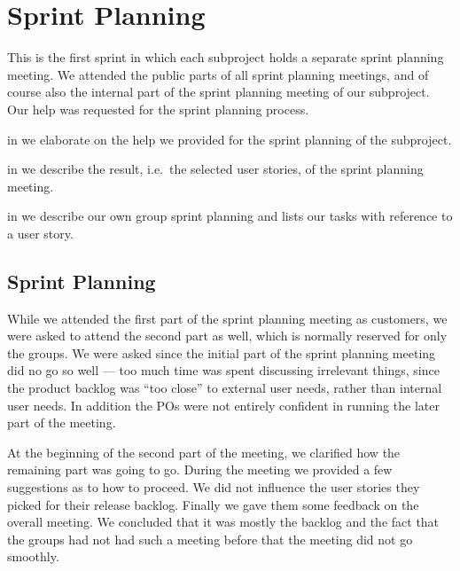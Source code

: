 \chapter{Sprint Planning}
This is the first sprint in which each subproject holds a separate sprint planning meeting. We attended the public parts of all sprint planning meetings, and of course also the internal part of the sprint planning meeting of our subproject. Our help was requested for the \db sprint planning process.

\begin{chapterorganization}
  \item in  we elaborate on the help we provided for the sprint planning of the \db subproject.
  \item in  we describe the result, i.e.\ the selected user stories, of the \bd sprint planning meeting.
  \item in  we describe our own group sprint planning and lists our tasks with reference to a user story.
\end{chapterorganization}


\section{\dbtitle Sprint Planning}\label{sec:S2_db}
While we attended the first part of the \db sprint planning meeting as customers, we were asked to attend the second part as well, which is normally reserved for only the \db groups. We were asked since the initial part of the sprint planning meeting did no go so well --- too much time was spent discussing irrelevant things, since the product backlog was ``too close'' to external user needs, rather than internal user needs. In addition the \db POs were not entirely confident in running the later part of the meeting.

At the beginning of the second part of the meeting, we clarified how the remaining part was going to go. During the meeting we provided a few suggestions as to how to proceed. We did not influence the user stories they picked for their release backlog. Finally we gave them some feedback on the overall meeting. We concluded that it was mostly the backlog and the fact that the \db groups had not had such a meeting before that the meeting did not go smoothly.

